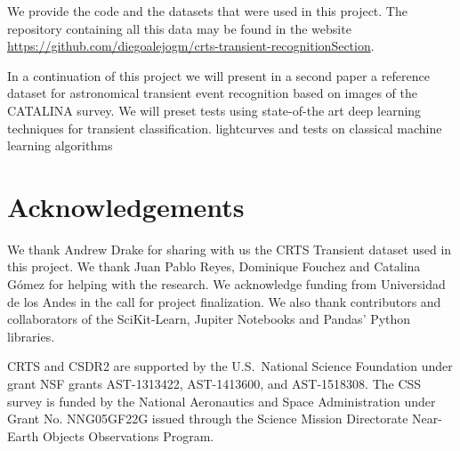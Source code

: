 \documentclass[a4paper,fleqn,usenatbib]{mnras}
\begin{document}
We provide the code and the datasets that were used in this project.
The repository containing all this data may be found in the website
\url{https://github.com/diegoalejogm/crts-transient-recognitionSection}. 


In a continuation of this project we will present in a second paper a
reference dataset for astronomical transient event recognition based
on images of the CATALINA survey. 
We will preset tests using state-of-the art deep learning
techniques for transient classification.
 lightcurves and tests on classical machine learning algorithms



\section*{Acknowledgements}

We thank Andrew Drake for sharing with us the CRTS Transient dataset
used in this project.  
We thank Juan Pablo Reyes, Dominique Fouchez and Catalina G\'omez for
helping with the research. 
We acknowledge funding from Universidad de los Andes in the call for
project finalization.
We also thank contributors and collaborators of the SciKit-Learn,
Jupiter Notebooks and Pandas' Python libraries.  

CRTS and CSDR2 are supported by the U.S.~National Science 
Foundation under grant NSF grants AST-1313422, AST-1413600, and 
AST-1518308.  The CSS survey is funded by the National Aeronautics
and Space Administration under Grant No. NNG05GF22G issued through
the Science Mission Directorate Near-Earth Objects Observations Program.





\end{document}
